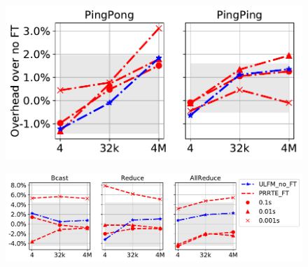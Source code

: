 \documentclass[sigconf]{acmart}
\begin{document}
\begin{figure}[h]
\centering
\begin{minipage}{.37\textwidth}
  \centering
  \includegraphics[width=\linewidth]{multi_pingping_pingpong_overhead.pdf}
  \label{fig:Ring}
\end{minipage}%
\begin{minipage}{.63\textwidth}
  \centering
  \includegraphics[width=\linewidth]{Bcast_overhead_with_ulfm_max_col.pdf}
  \label{fig:Reconnect Ring}
\end{minipage}
\end{figure}
\end{document}
